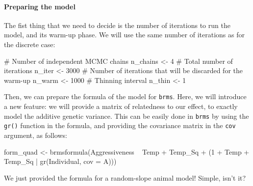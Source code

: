 \documentclass[a4paper,12pt,twoside]{article}
\begin{document}
\paragraph{Preparing the model}
The fist thing that we need to decide is the number of iterations to run the model, and its warm-up phase. We will use the same number of iterations as for the discrete case:
\begin{Rinput}
# Number of independent MCMC chains
n_chains <- 4
# Total number of iterations
n_iter <- 3000
# Number of iterations that will be discarded for the warm-up
n_warm <- 1000
# Thinning interval
n_thin <- 1
\end{Rinput}
Then, we can prepare the formula of the model for \texttt{brms}. Here, we will introduce a new feature: we will provide a matrix of relatedness to our effect, to exactly model the additive genetic variance. This can be easily done in \texttt{brms} by using the \texttt{gr()} function in the formula, and providing the covariance matrix in the \texttt{cov} argument, as follows:
\begin{Rinput}
form_quad <- brmsformula(Aggressiveness ~ Temp + Temp_Sq +
                                          (1 + Temp + Temp_Sq | gr(Individual, cov = A)))
\end{Rinput}
We just provided the formula for a random-slope animal model! Simple, isn't it?
\end{document}
